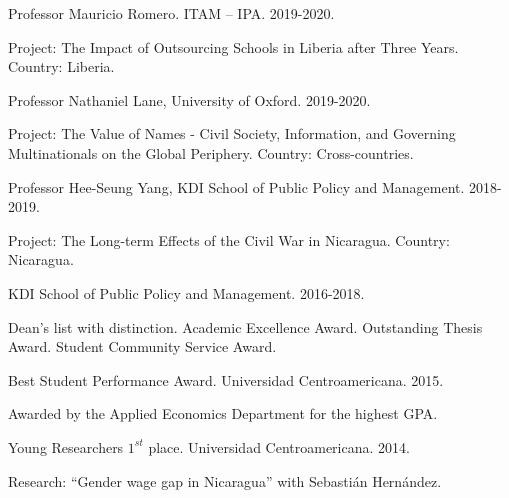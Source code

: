 \documentclass[11pt,article,oneside, a4paper]{memoir}
\begin{document}
\ind Professor Mauricio Romero. ITAM -- IPA. 2019-2020.

\ind \hspace{0.35in} \footnotesize Project: The Impact of Outsourcing Schools in Liberia after
Three Years. \newline Country: Liberia. \normalsize \vspace{0.01in}

\ind Professor Nathaniel Lane, University of Oxford. 2019-2020.

\ind \hspace{0.35in} \footnotesize Project: The Value of Names - Civil Society, Information, and Governing Multinationals on the
Global Periphery. \newline Country: Cross-countries. \normalsize \vspace{0.01in}

\ind Professor Hee-Seung Yang, KDI School of Public Policy and Management. 2018-2019.

\ind \hspace{0.35in} \footnotesize Project: The Long-term Effects of the Civil War in Nicaragua. \newline Country: Nicaragua. \normalsize \vspace{0.01in}

\medskip

\ind KDI School of Public Policy and Management. 2016-2018.

\ind \hspace{0.35in} \footnotesize Dean's list with distinction. Academic Excellence Award. Outstanding Thesis Award. \newline Student Community Service Award. \normalsize \vspace{0.01in}

\ind Best Student Performance Award. Universidad Centroamericana. 2015.

\ind \hspace{0.35in} \footnotesize Awarded by the Applied Economics Department for the highest GPA. \normalsize \vspace{0.01in}

\ind Young Researchers $1^{st}$ place. Universidad Centroamericana. 2014. 

\ind \hspace{0.35in} \footnotesize Research: ``Gender wage gap in Nicaragua'' with Sebastián Hernández. \normalsize \vspace{0.01in}
\end{document}
